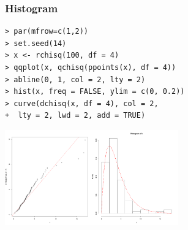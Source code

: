 \documentclass[xcolor={table},c]{beamer}
\begin{document}
\begin{frame}[fragile]\frametitle{Histogram}
\begin{center}
\begin{verbatim}
> par(mfrow=c(1,2))
> set.seed(14)
> x <- rchisq(100, df = 4)
> qqplot(x, qchisq(ppoints(x), df = 4))
> abline(0, 1, col = 2, lty = 2)
> hist(x, freq = FALSE, ylim = c(0, 0.2))
> curve(dchisq(x, df = 4), col = 2, 
+  lty = 2, lwd = 2, add = TRUE)
\end{verbatim}
  \includegraphics[width=7.5cm]{hist8.png}
\end{center}
\end{frame}
\end{document}
